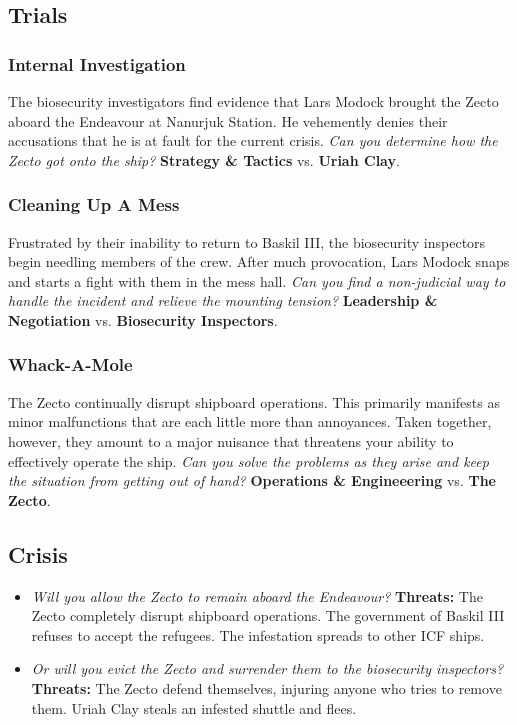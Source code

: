 \documentclass[11pt, a5paper, parskip=half-, DIV=12]{scrartcl}
\begin{document}
\newpage

\subsection*{Trials}
\subsubsection*{Internal Investigation}
The biosecurity investigators find evidence that Lars Modock brought the Zecto aboard the Endeavour at Nanurjuk Station. He vehemently denies their accusations that he is at fault for the current crisis. \textit{Can you determine how the Zecto got onto the ship?} \textbf{Strategy \& Tactics} vs. \textbf{Uriah Clay}.

\subsubsection*{Cleaning Up A Mess}
Frustrated by their inability to return to Baskil III, the biosecurity inspectors begin needling members of the crew. After much provocation, Lars Modock snaps and starts a fight with them in the mess hall. \textit{Can you find a non-judicial way to handle the incident and relieve the mounting tension?}
\textbf{Leadership \& Negotiation} vs. \textbf{Biosecurity Inspectors}.

\subsubsection*{Whack-A-Mole}
The Zecto continually disrupt shipboard operations. This primarily manifests as minor malfunctions that are each little more than annoyances. Taken together, however, they amount to a major nuisance that threatens your ability to effectively operate the ship. \textit{Can you solve the problems as they arise and keep the situation from getting out of hand?} \textbf{Operations \& Engineeering} vs. \textbf{The Zecto}.

\subsection*{Crisis}

\begin{itemize}
	\item \textit{Will you allow the Zecto to remain aboard the Endeavour?} \textbf{Threats:} The Zecto completely disrupt shipboard operations. The government of Baskil III refuses to accept the refugees. The infestation spreads to other ICF ships.
	\item \textit{Or will you evict the Zecto and surrender them to the biosecurity inspectors?} \textbf{Threats:} The Zecto defend themselves, injuring anyone who tries to remove them. Uriah Clay steals an infested shuttle and flees.
\end{itemize}
\end{document}
